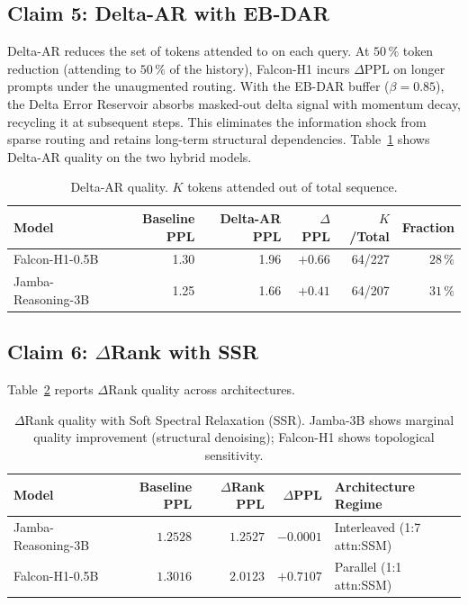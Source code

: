\documentclass[11pt]{article}
\newcommand{\dsig}{\Delta}
\begin{document}
\subsection{Claim 5: Delta-AR with EB-DAR}
Delta-AR reduces the set of tokens attended to on each query. At $50\,\%$
token reduction (attending to $50\,\%$ of the history), Falcon-H1 incurs
$\Delta\mathrm{PPL}$ on longer prompts under the unaugmented routing. With
the EB-DAR buffer ($\beta{=}0.85$), the Delta Error Reservoir absorbs
masked-out delta signal with momentum decay, recycling it at subsequent
steps. This eliminates the information shock from sparse routing and retains
long-term structural dependencies. Table~\ref{tab:deltaar} shows Delta-AR
quality on the two hybrid models.

\begin{table}[H]
\centering
\small
\caption{Delta-AR quality. $K$ tokens attended out of total sequence.}
\label{tab:deltaar}
\begin{tabular}{lrrrrr}
\toprule
Model & Baseline PPL & Delta-AR PPL & $\Delta$PPL & $K$/Total & Fraction \\
\midrule
Falcon-H1-0.5B     & 1.30 & 1.96 & $+0.66$ & 64/227 & $28\,\%$ \\
Jamba-Reasoning-3B & 1.25 & 1.66 & $+0.41$ & 64/207 & $31\,\%$ \\
\bottomrule
\end{tabular}
\end{table}

\subsection{Claim 6: $\dsig$Rank with SSR}
Table~\ref{tab:drank_arch} reports $\dsig$Rank quality across architectures.

\begin{table}[H]
\centering
\small
\caption{$\dsig$Rank quality with Soft Spectral Relaxation (SSR). Jamba-3B
         shows marginal quality improvement (structural denoising); Falcon-H1
         shows topological sensitivity.}
\label{tab:drank_arch}
\begin{tabular}{lrrrl}
\toprule
Model & Baseline PPL & $\dsig$Rank PPL & $\Delta$PPL & Architecture Regime \\
\midrule
Jamba-Reasoning-3B & $1.2528$ & $1.2527$ & $-0.0001$ & Interleaved (1:7 attn:SSM) \\
Falcon-H1-0.5B     & $1.3016$ & $2.0123$ & $+0.7107$ & Parallel (1:1 attn:SSM) \\
\bottomrule
\end{tabular}
\end{table}
\end{document}
